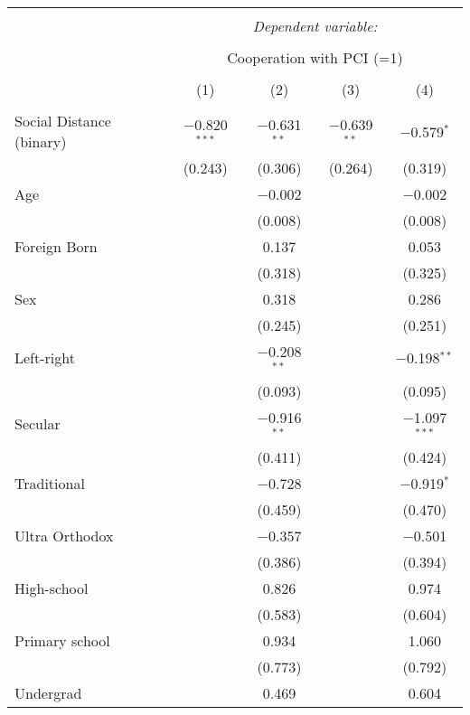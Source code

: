 \documentclass[12pt,letterpaper]{article}
\begin{document}
\begin{table}[!htbp] \centering 
	\small
	\caption{} 
	\label{} 
	\begin{tabular}{@{\extracolsep{5pt}}lcccc} 
		\\[-1.8ex]\hline 
		\hline \\[-1.8ex] 
		& \multicolumn{4}{c}{\textit{Dependent variable:}} \\ 
		\cline{2-5} 
		\\[-1.8ex] & \multicolumn{4}{c}{Cooperation with PCI (=1)} \\ 
		\\[-1.8ex] & (1) & (2) & (3) & (4)\\ 
		\hline \\[-1.8ex] 
		Social Distance (binary) & $-$0.820$^{***}$ & $-$0.631$^{**}$ & $-$0.639$^{**}$ & $-$0.579$^{*}$ \\ 
		& (0.243) & (0.306) & (0.264) & (0.319) \\ 
		Age &  & $-$0.002 &  & $-$0.002 \\ 
		&  & (0.008) &  & (0.008) \\ 
		Foreign Born &  & 0.137 &  & 0.053 \\ 
		&  & (0.318) &  & (0.325) \\ 
		Sex &  & 0.318 &  & 0.286 \\ 
		&  & (0.245) &  & (0.251) \\ 
		Left-right &  & $-$0.208$^{**}$ &  & $-$0.198$^{**}$ \\ 
		&  & (0.093) &  & (0.095) \\ 
		Secular &  & $-$0.916$^{**}$ &  & $-$1.097$^{***}$ \\ 
		&  & (0.411) &  & (0.424) \\ 
		Traditional &  & $-$0.728 &  & $-$0.919$^{*}$ \\ 
		&  & (0.459) &  & (0.470) \\ 
		Ultra Orthodox &  & $-$0.357 &  & $-$0.501 \\ 
		&  & (0.386) &  & (0.394) \\ 
		High-school &  & 0.826 &  & 0.974 \\ 
		&  & (0.583) &  & (0.604) \\ 
		Primary school &  & 0.934 &  & 1.060 \\ 
		&  & (0.773) &  & (0.792) \\ 
		Undergrad &  & 0.469 &  & 0.604 \\ 

\end{tabular}
\end{table}
\end{document}
